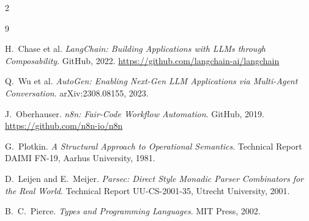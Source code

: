 \documentclass[10pt]{article}
\begin{document}
\begin{multicols}{2}
\begin{thebibliography}{9}

H.~Chase et al.
\textit{LangChain: Building Applications with LLMs through Composability}.
GitHub, 2022.
\url{https://github.com/langchain-ai/langchain}

Q.~Wu et al.
\textit{AutoGen: Enabling Next-Gen LLM Applications via Multi-Agent
Conversation}.
arXiv:2308.08155, 2023.

J.~Oberhauser.
\textit{n8n: Fair-Code Workflow Automation}.
GitHub, 2019.
\url{https://github.com/n8n-io/n8n}

G.~Plotkin.
\textit{A Structural Approach to Operational Semantics}.
Technical Report DAIMI FN-19, Aarhus University, 1981.

D.~Leijen and E.~Meijer.
\textit{Parsec: Direct Style Monadic Parser Combinators for the Real World}.
Technical Report UU-CS-2001-35, Utrecht University, 2001.

B.~C.~Pierce.
\textit{Types and Programming Languages}.
MIT Press, 2002.

\end{thebibliography}

\end{multicols}
\end{document}
